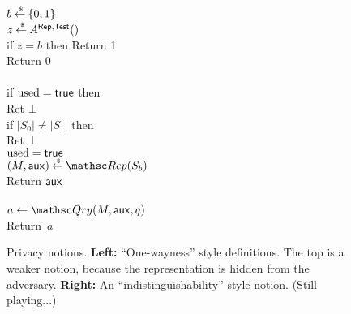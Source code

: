 \begin{figure}[htp]
\centering
{}
%
{
{
\\
$b {\:\stackrel{{\scriptscriptstyle \hspace{0.2em}\$}} {\leftarrow}\:} \{0,1\}$\\
$z {\:\stackrel{{\scriptscriptstyle \hspace{0.2em}\$}} {\leftarrow}\:} A^{\mathsf{Rep},\mathsf{Test}}()$\\
if $z = b$ then Return 1\\
Return 0\\
}
%
{
\\
if $\mathrm{used}=\mathsf{true}$ then \\
\nudge Ret $\bot$\\
if $|S_0|\neq|S_1|$ then \\
\nudge Ret $\bot$\\
$\mathrm{used}=\mathsf{true}$\\
$(M,\aux) \getsr \Rep(S_b)$\\
Return ${\sf aux}$\\

\medskip
{}\\
$a \gets \Qry(M,\aux,q)$\\
Return~$a$\\
}
}
\caption{Privacy notions. {\bf Left:} ``One-wayness'' style
  definitions. The top is a weaker notion, because the representation
  is hidden from the adversary. {\bf Right:} An
  ``indistinguishability'' style notion. (Still playing...)} 
\label{fig:privacy}
\end{figure}